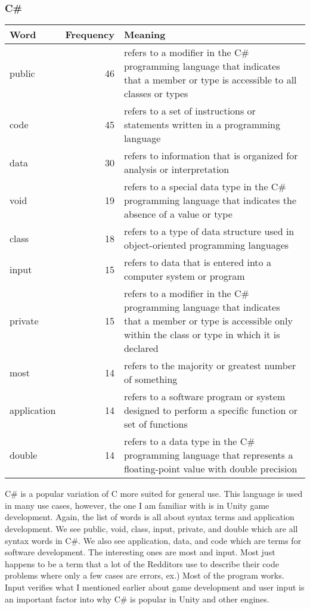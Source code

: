 \documentclass{article}
\theoremstyle{theorem}
\theoremstyle{definition}
\theoremstyle{remark}
\begin{document}
\subsubsection{C\#}
\begin{tabular}{ | l | r | p{7cm} | }
\hline
Word & Frequency & Meaning \\
\hline
public & 46 & refers to a modifier in the C# programming language that indicates that a member or type is accessible to all classes or types \\
\hline
code & 45 & refers to a set of instructions or statements written in a programming language \\
\hline
data & 30 & refers to information that is organized for analysis or interpretation \\
\hline
void & 19 & refers to a special data type in the C# programming language that indicates the absence of a value or type \\
\hline
class & 18 & refers to a type of data structure used in object-oriented programming languages \\
\hline
input & 15 & refers to data that is entered into a computer system or program \\
\hline
private & 15 & refers to a modifier in the C# programming language that indicates that a member or type is accessible only within the class or type in which it is declared \\
\hline
most & 14 & refers to the majority or greatest number of something \\
\hline
application & 14 & refers to a software program or system designed to perform a specific function or set of functions \\
\hline
double & 14 & refers to a data type in the C# programming language that represents a floating-point value with double precision \\
\hline
\end{tabular}

\medskip
C\# is a popular variation of C more suited for general use. This language is used in many use cases, however, the one I am familiar with is in Unity game development. Again, the list of words is all about syntax terms and application development. We see public, void, class, input, private, and double which are all syntax words in C\#. We also see application, data, and code which are terms for software development. The interesting ones are most and input. Most just happens to be a term that a lot of the Redditors use to describe their code problems where only a few cases are errors, ex.) Most of the program works. Input verifies what I mentioned earlier about game development and user input is an important factor into why C\# is popular in Unity and other engines.
\end{document}
